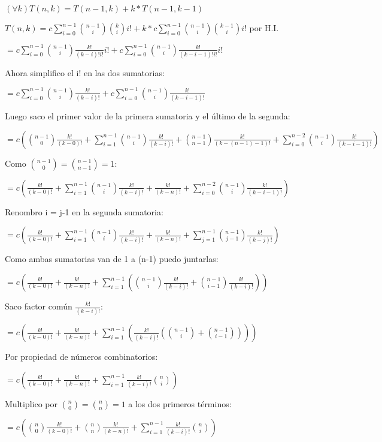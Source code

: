 $(\forall k) T(n,k) = T(n-1,k) + k*T(n-1,k-1)$

$T(n,k) = c \sum_{i=0}^{n-1} \binom{n-1}{i} \binom{k}{i} i! + k * c \sum_{i=0}^{n-1} \binom{n-1}{i} \binom{k-1}{i} i!$ por H.I.

$ = c \sum_{i=0}^{n-1} \binom{n-1}{i} \frac{k!}{(k-i)!i!} i! + c \sum_{i=0}^{n-1} \binom{n-1}{i} \frac{k!}{(k-i-1)!i!}i! $ 

Ahora simplifico el i! en las dos sumatorias:

$ = c \sum_{i=0}^{n-1} \binom{n-1}{i} \frac{k!}{(k-i)!} + c \sum_{i=0}^{n-1} \binom{n-1}{i} \frac{k!}{(k-i-1)!} $

Luego saco el primer valor de la primera sumatoria y el último de la segunda:

$ = c (\binom{n-1}{0} \frac{k!}{(k-0)!} + \sum_{i=1}^{n-1} \binom{n-1}{i} \frac{k!}{(k-i)!} + \binom{n-1}{n-1} \frac{k!}{(k-(n-1)-1)!} + \sum_{i=0}^{n-2} \binom{n-1}{i} \frac{k!}{(k-i-1)!} )$

Como $\binom{n-1}{0} = \binom{n-1}{n-1} = 1$:

$ = c (\frac{k!}{(k-0)!} + \sum_{i=1}^{n-1} \binom{n-1}{i} \frac{k!}{(k-i)!} + \frac{k!}{(k-n)!} + \sum_{i=0}^{n-2} \binom{n-1}{i} \frac{k!}{(k-i-1)!} )$

Renombro i = j-1 en la segunda sumatoria:

$ = c (\frac{k!}{(k-0)!} + \sum_{i=1}^{n-1} \binom{n-1}{i} \frac{k!}{(k-i)!} + \frac{k!}{(k-n)!} + \sum_{j=1}^{n-1} \binom{n-1}{j-1} \frac{k!}{(k-j)!} )$ 

Como ambas sumatorias van de 1 a (n-1) puedo juntarlas:

$ = c (\frac{k!}{(k-0)!} + \frac{k!}{(k-n)!} + \sum_{i=1}^{n-1} ( \binom{n-1}{i} \frac{k!}{(k-i)!} + \binom{n-1}{i-1} \frac{k!}{(k-i)!} ) )$ 

Saco factor común $\frac{k!}{(k-i)!}$:

$ = c (\frac{k!}{(k-0)!} + \frac{k!}{(k-n)!} + \sum_{i=1}^{n-1} ( \frac{k!}{(k-i)!} (\binom{n-1}{i} + \binom{n-1}{i-1} )))$ 

Por propiedad de números combinatorios:

$ = c (\frac{k!}{(k-0)!} + \frac{k!}{(k-n)!} + \sum_{i=1}^{n-1} \frac{k!}{(k-i)!}\binom{n}{i})$ 

Multiplico por $\binom{n}{0} = \binom{n}{n}= 1$ a los dos primeros términos:

$ = c (\binom{n}{0}\frac{k!}{(k-0)!} + \binom{n}{n}\frac{k!}{(k-n)!} + \sum_{i=1}^{n-1} \frac{k!}{(k-i)!}\binom{n}{i})$

